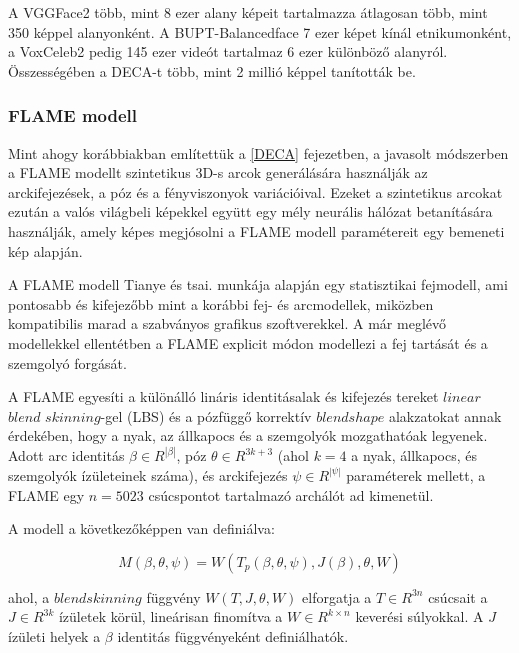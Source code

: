\documentclass[12pt,a4]{article}
\begin{document}
                A VGGFace2 több, mint 8 ezer alany képeit tartalmazza átlagosan több,
     	          mint 350 képpel alanyonként. A BUPT-Balancedface 7 ezer képet kínál
     	          etnikumonként, a VoxCeleb2 pedig 145 ezer videót tartalmaz 6 ezer
     	          különböző alanyról. Összességében a DECA-t több, mint 2 millió képpel tanították
     	          be.

            \subsubsection{FLAME modell}

                Mint ahogy korábbiakban említettük a \ref{DECA} fejezetben, a javasolt módszerben a FLAME modellt szintetikus 3D-s arcok generálására használják az arckifejezések, a póz és a fényviszonyok variációival. Ezeket a szintetikus arcokat ezután a valós világbeli képekkel együtt egy mély neurális hálózat betanítására használják, amely képes megjósolni a FLAME modell paramétereit egy bemeneti kép alapján.

                A FLAME modell Tianye és tsai. \cite{flame} munkája alapján egy statisztikai fejmodell, ami pontosabb és kifejezőbb mint a korábbi fej- és arcmodellek, miközben kompatibilis marad a szabványos grafikus szoftverekkel. A már meglévő modellekkel ellentétben a FLAME explicit módon modellezi a fej tartását és a szemgolyó forgását.

                A FLAME egyesíti a különálló lináris identitásalak és kifejezés tereket $linear$ $blend$ $skinning$-gel (LBS) és a pózfüggő korrektív $blendshape$ alakzatokat annak érdekében, hogy a nyak, az állkapocs és a szemgolyók mozgathatóak legyenek. Adott arc identitás $\beta \in R^{|\beta|}$, póz $\theta \in R^{3k+3}$ (ahol $k = 4$ a nyak, állkapocs, és szemgolyók ízületeinek száma), és arckifejezés $\psi \in R^{|\psi|}$ paraméterek mellett, a FLAME egy $n = 5023 $ csúcspontot tartalmazó archálót ad kimenetül.

                A modell a következőképpen van definiálva: 

                \begin{equation*}
                    M (\beta, \theta, \psi) = W (T_{p}(\beta, \theta, \psi), J(\beta), \theta, W)
                \end{equation*}

                ahol, a $blendskinning$ függvény $W (T, J, θ, W)$ elforgatja a  $T \in R^{3n}$ csúcsait a $J \in R^{3k}$ ízületek körül, lineárisan finomítva a $W \in R^{k\times n}$ keverési súlyokkal. A $J$ ízületi helyek a $\beta$ identitás függvényeként definiálhatók.
\end{document}
